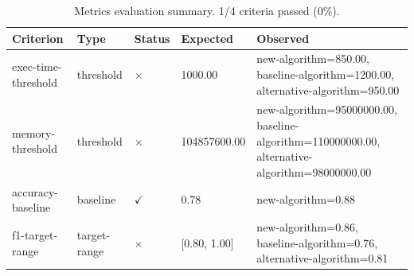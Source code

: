 \begin{table}[htbp]
  \centering
  \caption{Metrics evaluation summary. 1/4 criteria passed (0\%).}
  \label{tab:metrics-summary}
  \begin{tabular}{lllll}
    \toprule
    Criterion & Type & Status & Expected & Observed \\
    \midrule
    exec-time-threshold & threshold & $\times$ & 1000.00 & new-algorithm=850.00, baseline-algorithm=1200.00, alternative-algorithm=950.00 \\
    memory-threshold & threshold & $\times$ & 104857600.00 & new-algorithm=95000000.00, baseline-algorithm=110000000.00, alternative-algorithm=98000000.00 \\
    accuracy-baseline & baseline & $\checkmark$ & 0.78 & new-algorithm=0.88 \\
    f1-target-range & target-range & $\times$ & [0.80, 1.00] & new-algorithm=0.86, baseline-algorithm=0.76, alternative-algorithm=0.81 \\
    \bottomrule
  \end{tabular}
\end{table}

